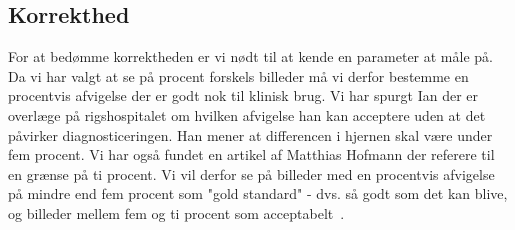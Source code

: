 \subsection{Korrekthed}

For at bedømme korrektheden er vi nødt til at kende en parameter at måle på. Da vi har valgt at se på procent forskels billeder må vi derfor bestemme en procentvis afvigelse der er godt nok til klinisk brug. Vi har spurgt Ian der er overlæge på rigshospitalet om hvilken afvigelse han kan acceptere uden at det påvirker diagnosticeringen. Han mener at differencen i hjernen skal være under fem procent. Vi har også fundet en artikel af Matthias Hofmann der referere til en grænse på ti procent. Vi vil derfor se på billeder med en procentvis afvigelse på mindre end fem procent som "gold standard" - dvs. så godt som det kan blive, og billeder mellem fem og ti procent som acceptabelt~\cite{accepteretAfvigelse}.